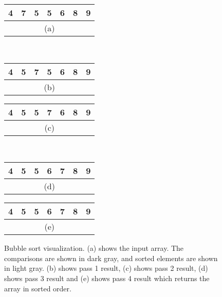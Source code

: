 \begin{figure}[!ht]
    \centering
    \begin{tabular}{|c|c|c|c|c|c|c|}
    \hline
    \cellcolor{gray}4 & \cellcolor{gray}7 & 5 & 5 & 6 & 8 & 9 \\
    \hline
    \multicolumn{7}{c}{(a)} \\
    \end{tabular}
    \,
    \begin{tabular}{|c|c|c|c|c|c|c|}
    \hline
    \cellcolor{lightgray}4 & \cellcolor{gray}5 & \cellcolor{gray}7 & 5 & 6 & 8 & 9 \\
    \hline
    \multicolumn{7}{c}{(b)} \\
    \end{tabular}
    \break
    \begin{tabular}{|c|c|c|c|c|c|c|}
    \hline
    \cellcolor{lightgray}4 & \cellcolor{lightgray}5 & \cellcolor{gray}5 & \cellcolor{gray}7 & 6 & 8 & 9 \\
    \hline
    \multicolumn{7}{c}{(c)} \\
    \end{tabular}
    \,
    \begin{tabular}{|c|c|c|c|c|c|c|}
    \hline
    \cellcolor{lightgray}4 & \cellcolor{lightgray}5 & \cellcolor{lightgray}5 & \cellcolor{gray}6 & \cellcolor{gray}7 & 8 & 9 \\
    \hline
    \multicolumn{7}{c}{(d)} \\
    \end{tabular}
    \break
    \begin{tabular}{|c|c|c|c|c|c|c|}
    \hline
    \cellcolor{lightgray}4 & \cellcolor{lightgray}5 & \cellcolor{lightgray}5 & \cellcolor{lightgray}6 & \cellcolor{lightgray}7 & \cellcolor{lightgray}8 & \cellcolor{lightgray}9 \\
    \hline
    \multicolumn{7}{c}{(e)} \\
    \end{tabular}
    
    \caption{Bubble sort visualization. (a) shows the input array. The comparisons are shown in dark gray, and sorted elements are shown in light gray. (b) shows pass 1 result, (c) shows pass 2 result, (d) shows pass 3 result and (e) shows pass 4 result which returns the array in sorted order.}
    \label{fig:bubblesort_ex}
\end{figure}

